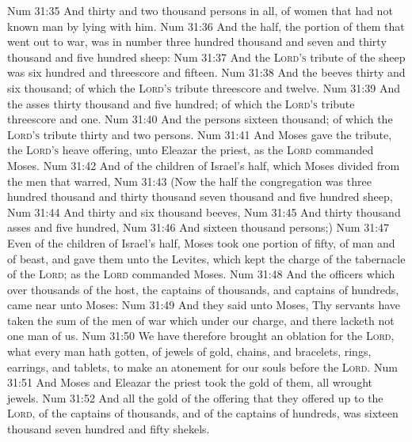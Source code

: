 \vs Num 31:35 And thirty and two thousand persons in all, of women that had not known man by lying with him.
\vs Num 31:36 And the half,  the portion of them that went out to war, was in number three hundred thousand and seven and thirty thousand and five hundred sheep:
\vs Num 31:37 And the \textsc{Lord's} tribute of the sheep was six hundred and threescore and fifteen.
\vs Num 31:38 And the beeves  thirty and six thousand; of which the \textsc{Lord's} tribute  threescore and twelve.
\vs Num 31:39 And the asses  thirty thousand and five hundred; of which the \textsc{Lord's} tribute  threescore and one.
\vs Num 31:40 And the persons  sixteen thousand; of which the \textsc{Lord's} tribute  thirty and two persons.
\vs Num 31:41 And Moses gave the tribute,  the \textsc{Lord's} heave offering, unto Eleazar the priest, as the \textsc{Lord} commanded Moses.
\vs Num 31:42 And of the children of Israel's half, which Moses divided from the men that warred,
\vs Num 31:43 (Now the half  the congregation was three hundred thousand and thirty thousand  seven thousand and five hundred sheep,
\vs Num 31:44 And thirty and six thousand beeves,
\vs Num 31:45 And thirty thousand asses and five hundred,
\vs Num 31:46 And sixteen thousand persons;)
\vs Num 31:47 Even of the children of Israel's half, Moses took one portion of fifty,  of man and of beast, and gave them unto the Levites, which kept the charge of the tabernacle of the \textsc{Lord}; as the \textsc{Lord} commanded Moses.
\vs Num 31:48 And the officers which  over thousands of the host, the captains of thousands, and captains of hundreds, came near unto Moses:
\vs Num 31:49 And they said unto Moses, Thy servants have taken the sum of the men of war which  under our charge, and there lacketh not one man of us.
\vs Num 31:50 We have therefore brought an oblation for the \textsc{Lord}, what every man hath gotten, of jewels of gold, chains, and bracelets, rings, earrings, and tablets, to make an atonement for our souls before the \textsc{Lord}.
\vs Num 31:51 And Moses and Eleazar the priest took the gold of them,  all wrought jewels.
\vs Num 31:52 And all the gold of the offering that they offered up to the \textsc{Lord}, of the captains of thousands, and of the captains of hundreds, was sixteen thousand seven hundred and fifty shekels.
